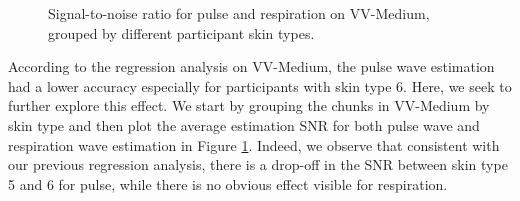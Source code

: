 \documentclass{article}
\begin{document}
\begin{figure}[h!]
  \centering
  \caption{Signal-to-noise ratio for pulse and respiration on VV-Medium, grouped by different participant skin types.}
  \label{fig:impact-skin-type}
\end{figure}

According to the regression analysis on VV-Medium, the pulse wave estimation had a lower accuracy especially for participants with skin type 6.
Here, we seek to further explore this effect.
We start by grouping the chunks in VV-Medium by skin type and then plot the average estimation SNR for both pulse wave and respiration wave estimation in Figure \ref{fig:impact-skin-type}.
Indeed, we observe that consistent with our previous regression analysis, there is a drop-off in the SNR between skin type 5 and 6 for pulse, while there is no obvious effect visible for respiration.

\datatable
\end{document}
